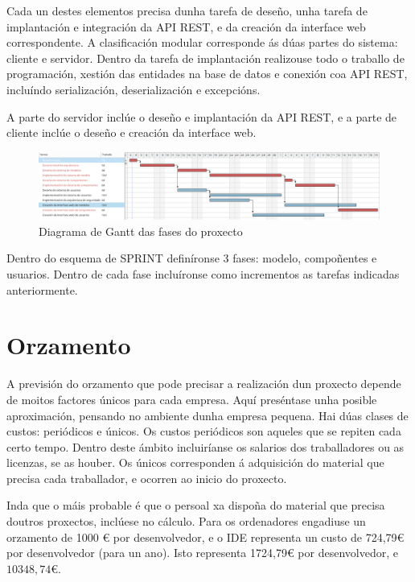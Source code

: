 Cada un destes elementos precisa dunha tarefa de deseño, unha tarefa de implantación e integración da API REST, e da creación da interface web correspondente. A clasificación modular corresponde ás dúas partes do sistema: cliente e servidor. Dentro da tarefa de implantación realizouse todo o traballo de programación, xestión das entidades na base de datos e conexión coa API REST, incluíndo serialización, deserialización e excepcións.

A parte do servidor inclúe o deseño e implantación da API REST, e a parte de cliente inclúe o deseño e creación da interface web.

\vspace*{5em}
\begin{figure}[htbp]
	\hspace*{-3cm}
	\centering
	\includegraphics[width=\textwidth,width=50em]{imaxes/gantt.png}
	\caption{Diagrama de Gantt das fases do proxecto}
	\label{fig:gantt}
\end{figure}
\vspace*{5em}

Dentro do esquema de SPRINT definíronse 3 fases: modelo, compoñentes e usuarios. Dentro de cada fase incluíronse como incrementos as tarefas indicadas anteriormente.

\section{Orzamento}

A previsión do orzamento que pode precisar a realización dun proxecto depende de moitos factores únicos para cada empresa. Aquí preséntase unha posible aproximación, pensando no ambiente dunha empresa pequena. Hai dúas clases de custos: periódicos e únicos. Os custos periódicos son aqueles que se repiten cada certo tempo. Dentro deste ámbito incluiríanse os salarios dos traballadores ou as licenzas, se as houber. Os únicos corresponden á adquisición do material que precisa cada traballador, e ocorren ao inicio do proxecto.

Inda que o máis probable é que o persoal xa dispoña do material que precisa doutros proxectos, inclúese no cálculo. Para os ordenadores engadiuse un orzamento de 1000 € por desenvolvedor, e o IDE representa un custo de 724,79€ por desenvolvedor (para un ano). Isto representa 1724,79€ por desenvolvedor, e $ 10 348,74€ $.

